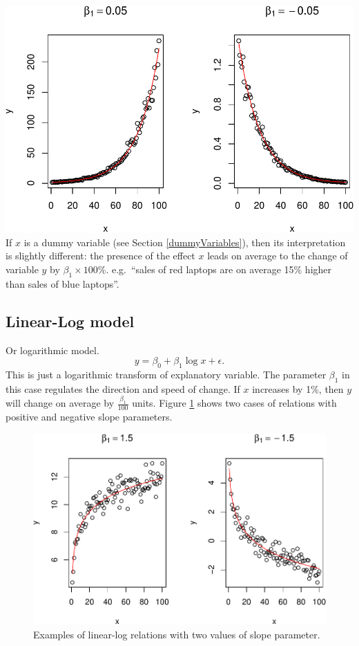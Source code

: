 \documentclass[
]{book}
\theoremstyle{definition}
\theoremstyle{definition}
\theoremstyle{definition}
\theoremstyle{definition}
\theoremstyle{remark}
\begin{document}
\includegraphics{Svetunkov---Statistics-for-Business-Analytics_files/figure-latex/transformationsExamples02-1.pdf}
If \(x\) is a dummy variable (see Section \ref{dummyVariables}), then its interpretation is slightly different: the presence of the effect \(x\) leads on average to the change of variable \(y\) by \(\beta_1 \times 100\)\%. e.g.~``sales of red laptops are on average 15\% higher than sales of blue laptops''.

\hypertarget{linear-log-model}{%
\subsection{Linear-Log model}\label{linear-log-model}}

Or logarithmic model.
\begin{equation}
    y = \beta_0 + \beta_1 \log x + \epsilon .
    \label{eq:transformLinearLog}
\end{equation}
This is just a logarithmic transform of explanatory variable. The parameter \(\beta_1\) in this case regulates the direction and speed of change. If \(x\) increases by 1\%, then \(y\) will change on average by \(\frac{\beta_1}{100}\) units. Figure \ref{fig:transformationsExamples03} shows two cases of relations with positive and negative slope parameters.

\begin{figure}
\centering
\includegraphics{Svetunkov---Statistics-for-Business-Analytics_files/figure-latex/transformationsExamples03-1.pdf}
\caption{\label{fig:transformationsExamples03}Examples of linear-log relations with two values of slope parameter.}
\end{figure}
\end{document}
